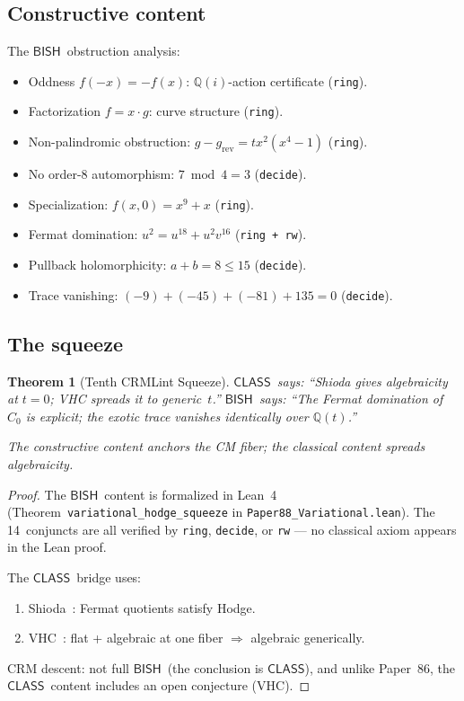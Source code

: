 \documentclass[11pt]{article}
\theoremstyle{plain}
\newtheorem{theorem}{Theorem}[section]
\theoremstyle{definition}
\theoremstyle{remark}
\newcommand{\Q}{\mathbb{Q}}
\newcommand{\BISH}{\ensuremath{\mathsf{BISH}}}
\newcommand{\CLASS}{\ensuremath{\mathsf{CLASS}}}
\begin{document}
\subsection{Constructive content}

The \BISH\ obstruction analysis:
\begin{itemize}[nosep]
  \item Oddness $f(-x) = -f(x)$: $\Q(i)$-action certificate (\texttt{ring}).
  \item Factorization $f = x \cdot g$: curve structure (\texttt{ring}).
  \item Non-palindromic obstruction: $g - g_{\mathrm{rev}} = tx^2(x^4-1)$ (\texttt{ring}).
  \item No order-8 automorphism: $7 \bmod 4 = 3$ (\texttt{decide}).
  \item Specialization: $f(x, 0) = x^9 + x$ (\texttt{ring}).
  \item Fermat domination: $u^2 = u^{18} + u^2 v^{16}$ (\texttt{ring + rw}).
  \item Pullback holomorphicity: $a + b = 8 \leq 15$ (\texttt{decide}).
  \item Trace vanishing: $(-9) + (-45) + (-81) + 135 = 0$ (\texttt{decide}).
\end{itemize}

\subsection{The squeeze}

\begin{theorem}[Tenth CRMLint Squeeze]\label{thm:squeeze}
\CLASS\ says: ``Shioda gives algebraicity at $t=0$; VHC spreads it
to generic~$t$.''
\BISH\ says: ``The Fermat domination of $C_0$ is explicit; the
exotic trace vanishes identically over $\Q(t)$.''

The constructive content anchors the CM fiber; the classical
content spreads algebraicity.
\end{theorem}

\begin{proof}
The \BISH\ content is formalized in Lean~4
(Theorem~\texttt{variational\_hodge\_squeeze} in
\texttt{Paper88\_Variational.lean}).  The 14~conjuncts are all
verified by \texttt{ring}, \texttt{decide}, or \texttt{rw} --- no
classical axiom appears in the Lean proof.

The \CLASS\ bridge uses:
\begin{enumerate}[nosep]
  \item Shioda~\cite{Shioda82}: Fermat quotients satisfy Hodge.
  \item VHC~\cite{Grothendieck66}: flat + algebraic at one fiber
    $\Rightarrow$ algebraic generically.
\end{enumerate}
CRM descent: not full \BISH\ (the conclusion is \CLASS),
and unlike Paper~86, the \CLASS\ content includes an open
conjecture (VHC).
\end{proof}
\end{document}
